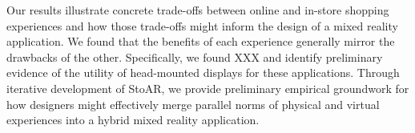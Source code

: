 Our results illustrate concrete trade-offs between online and in-store shopping experiences and how those trade-offs might inform the design of a mixed reality application. We found that the benefits of each experience generally mirror the drawbacks of the other.  Specifically, we found XXX and identify preliminary evidence of the utility of head-mounted displays for these applications. Through iterative development of StoAR, we provide preliminary empirical groundwork for how designers might effectively merge parallel norms of physical and virtual experiences into a hybrid mixed reality application. 



